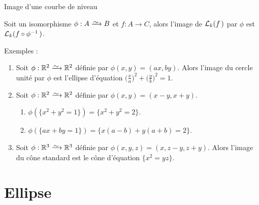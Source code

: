 \documentclass[11pt]{m53beamer}
\begin{document}
\begin{frame}{Image d'une courbe de niveau}
  \begin{proposition}
    Soit un isomorphisme $\phi:A\isoto B$ et $f:A\to C$, alors l'image de $\mathcal{L}_{k}(f\,)$ par $\phi$ est $\mathcal{L}_{k}(f\circ \phi^{-1}\,)$.
  \end{proposition}\pause
  Exemples :
  \begin{enumerate}[<+(1)->]
  \item Soit $\phi:\mathbb{R}^{2}\isoto\mathbb{R}^{2}$ définie par $\phi(x,y)=(ax,by)$. Alors l'image du cercle unité par $\phi$ est l'ellipse d'équation $\big(\frac{x}{a}\big)^{2}+\big(\frac{y}{b}\big)^{2}=1$.
  \item Soit $\phi:\mathbb{R}^{2}\isoto\mathbb{R}^{2}$ définie par $\phi(x,y)=(x-y,x+y)$.
    \begin{enumerate}[<+(1)->]
      \item $\phi(\{x^{2}+y^{2}=1\}) = \{x^{2}+y^{2}=2\}$.
      \item $\phi(\{ax+by=1\}) = \{x(a-b)+y(a+b)=2\}$.
    \end{enumerate}\pause
  \item Soit $\phi:\mathbb{R}^{3}\isoto\mathbb{R}^{3}$ définie par $\phi(x,y,z)=(x,z-y,z+y)$.\pause{} Alors l'image du cône standard est le cône d'équation $\{x^{2}=yz\}$.
  \end{enumerate}
\end{frame}

\section{Ellipse}
\end{document}

